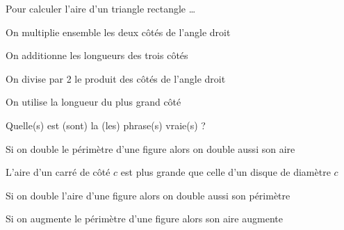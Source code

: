 \begin{QCM}
  \begin{GroupeQCM}
 
    
    \begin{exercice}
      Pour calculer l'aire d'un triangle rectangle \ldots
      \begin{ChoixQCM}{4}
      \item On multiplie ensemble les deux côtés de l'angle droit
      \item On additionne les longueurs des trois côtés
      \item On divise par 2 le produit des côtés de l'angle droit
      \item On utilise la longueur du plus grand côté
      \end{ChoixQCM}
\begin{corrige}
   \end{corrige}
    \end{exercice}
    
    
    \begin{exercice}
      Quelle(s) est (sont) la (les) phrase(s) vraie(s) ?
      \begin{ChoixQCM}{4}
      \item Si on double le périmètre d'une figure alors on double aussi son aire
      \item L'aire d'un carré de côté $c$ est plus grande que celle d'un disque de diamètre $c$
      \item Si on double l'aire d'une figure alors on double aussi son périmètre
      \item Si on augmente le périmètre d'une figure alors son aire augmente
      \end{ChoixQCM}
\begin{corrige}
   \end{corrige}
    \end{exercice}

\end{GroupeQCM}
\end{QCM}

  
